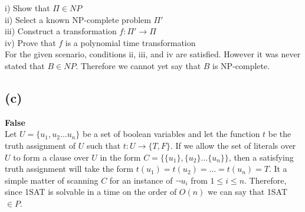 		\noindent
		i) Show that $\Pi \in NP$\\
		ii) Select a known NP-complete problem $\Pi'$\\
		iii) Construct a transformation $f: \Pi' \rightarrow \Pi$\\
		iv) Prove that $f$ is a polynomial time transformation\\
		
		\noindent
		For the given scenario, conditions ii, iii, and iv are satisfied. However it was never stated that $B \in NP$. Therefore we cannot yet say that $B$ is NP-complete. 
		
	\subsection*{(c)}
		\textbf{False}\\
		Let $U = \{u_1, u_2 \dots u_n\}$ be a set of boolean variables and let the function $t$ be the truth assignment of $U$ such that $t:U\rightarrow\{T,F\}$. If we allow the set of literals over $U$ to form a clause over $U$ in the form $C = \{\{u_1\}, \{u_2\} \dots \{u_n\}\}$, then a satisfying truth assignment will take the form $t(u_1) = t(u_2)= \dots = t(u_n) = T$. It a simple matter of scanning $C$ for an instance of $\neg u_i$ from $1\leq i \leq n$. Therefore, since 1SAT is solvable in a time on the order of $O(n)$ we can say that 1SAT $\in P$.